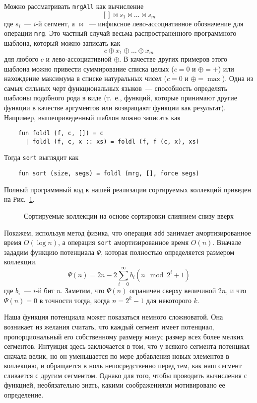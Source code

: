 \begin{remark}
  Можно рассматривать \lstinline!mrgAll! как вычисление
  $$
  [] \bowtie s_1 \bowtie \ldots \bowtie s_m
  $$
  где $s_i$~--- $i$-й сегмент, а $\bowtie$~--- инфиксное
  лево-ассоциативное обозначение для операции \lstinline!mrg!. Это частный случай весьма
  распространенного программного шаблона, который можно записать как
  $$
  c \oplus x_1 \oplus \ldots \oplus x_m
  $$
  для любого $c$ и лево-ассоциативной $\oplus$. В качестве других
  примеров этого шаблона можно привести суммирование списка целых ($c
  = 0$ и $\oplus = +$) или нахождение максимума в списке натуральных
  чисел ($c = 0$ и $\oplus = \max$). Одна из самых сильных черт
  функциональных языков~--- способность определять шаблоны подобного
  рода в виде 
  (т.~е., функций, которые принимают другие функции в качестве
  аргументов или возвращают функции как результат). Например,
  вышеприведенный шаблон можно записать как
  \begin{lstlisting}
    fun foldl (f, c, []) = c
      | foldl (f, c, x :: xs) = foldl (f, f (c, x), xs)
  \end{lstlisting}
  Тогда \lstinline!sort! выглядит как
  \begin{lstlisting}
    fun sort (size, segs) = foldl (mrg, [], force segs)
  \end{lstlisting}
\end{remark}
Полный программный код к нашей реализации сортируемых коллекций
приведен на Рис.~\ref{fig:6.5}.

\begin{figure}
  \centering
  
  \caption{Сортируемые коллекции на основе сортировки слиянием снизу вверх}
  \label{fig:6.5}
\end{figure}

Покажем, используя метод физика, что операция \lstinline!add! занимает
амортизированное время $O(\log n)$, а операция \lstinline!sort!
амортизированное время $O(n)$.  Вначале зададим функцию потенциала
$\Psi$, которая полностью определяется размером коллекции.
$$
\Psi(n) = 2n - 2 \sum_{i=0}^{\infty} b_i (n \mod 2^i+1)
$$
где $b_i$~--- $i$-й бит $n$. Заметим, что $\Psi(n)$ ограничен сверху
величиной $2n$, и что $\Psi(n) = 0$ в точности тогда, когда $n = 2^k -
1$ для некоторого $k$.

\begin{remark}
  Наша функция потенциала может показаться немного сложноватой. Она
  возникает из желания считать, что каждый сегмент имеет потенциал,
  пропорциональный его собственному размеру минус размер всех более
  мелких сегментов. Интуиция здесь заключается в том, что у всякого
  сегмента потенциал сначала велик, но он уменьшается по мере
  добавления новых элементов в коллекцию, и обращается в ноль
  непосредственно перед тем, как наш сегмент сливается с другим
  сегментом. Однако для того, чтобы проводить вычисления с функцией,
  необязательно знать, какими соображениями мотивировано ее
  определение. 
\end{remark}

